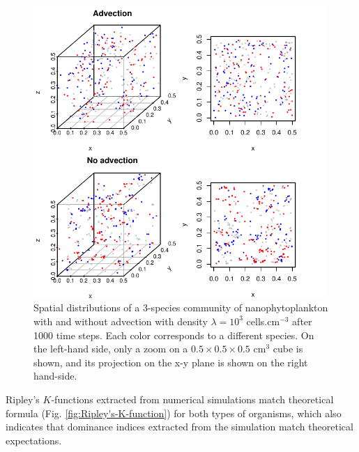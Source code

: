 \documentclass[english]{article}
\begin{document}
\begin{figure}[H]
\begin{centering}
\includegraphics[width=0.99\textwidth]{../code/figure/spatial_distribution_zoom_nano}
\par\end{centering}
\caption{Spatial distributions of a 3-species community of nanophytoplankton
with and without advection with density $\lambda=10^{3}$ cells.cm$^{-3}$
after 1000 time steps. Each color corresponds to a different species.
On the left-hand side, only a zoom on a $0.5\times0.5\times0.5$ cm$^{3}$
cube is shown, and its projection on the x-y plane is shown on the
right hand-side. \label{fig:Spatial-distributions} }
\end{figure}

Ripley's $K$-functions extracted from numerical simulations match
theoretical formula (Fig. \ref{fig:Ripley's-K-function}) for both
types of organisms, which also indicates that dominance indices extracted
from the simulation match theoretical expectations.
\end{document}
